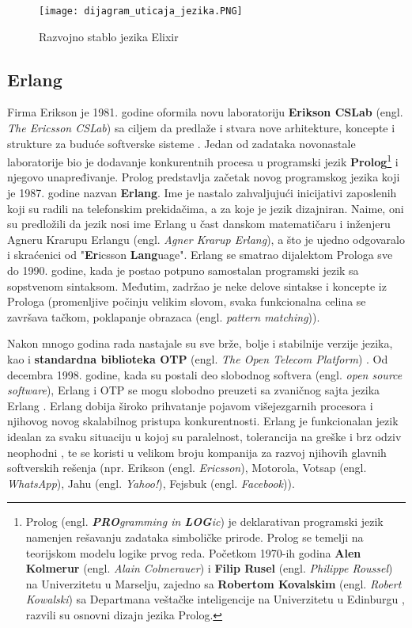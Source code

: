 \documentclass[12pt,oneside]{memoir}
\begin{document}
\begin{figure}[!ht]
  \centering
  \texttt{[image: dijagram\_uticaja\_jezika.PNG]}
  \caption{Razvojno stablo jezika Elixir}
  \label{fig:razvojnoStablo}
\end{figure}



\subsection{Erlang}
Firma Erikson je 1981. godine oformila novu laboratoriju \textbf{Erikson CSLab} (engl. \textit{The Ericsson CSLab}) sa ciljem da predlaže i stvara nove arhitekture, koncepte i strukture za buduće softverske sisteme \cite{ErlangBook2}. Jedan od zadataka novonastale laboratorije bio je dodavanje konkurentnih procesa u programski jezik \textbf{Prolog}\footnote{Prolog (engl. \textit{\textbf{PRO}gramming in \textbf{LOG}ic}) je deklarativan programski jezik namenjen rešavanju zadataka simboličke prirode. Prolog se temelji na teorijskom modelu logike prvog reda. Početkom 1970-ih godina \textbf{Alen Kolmerur} (engl. \textit{Alain Colmerauer}) i \textbf{Filip Rusel} (engl. \textit{Philippe Roussel}) na Univerzitetu u Marselju, zajedno sa \textbf{Robertom Kovalskim} (engl. \textit{Robert Kowalski}) sa Departmana veštačke inteligencije na Univerzitetu u Edinburgu , razvili su osnovni dizajn jezika Prolog.} i njegovo unapređivanje. Prolog predstavlja začetak novog programskog jezika koji je 1987. godine nazvan \textbf{Erlang}. Ime je nastalo zahvaljujući inicijativi zaposlenih koji su radili na telefonskim prekidačima, a za koje je jezik dizajniran. Naime, oni su predložili da jezik nosi ime Erlang u čast danskom matematičaru i inženjeru Agneru Krarupu Erlangu (engl. \textit{Agner Krarup Erlang}), a što je ujedno odgovaralo i skraćenici od  "\textbf{Er}icsson \textbf{Lang}uage". Erlang se smatrao dijalektom Prologa sve do 1990. godine, kada je postao potpuno samostalan programski jezik sa sopstvenom sintaksom. Međutim, zadržao je neke delove sintakse i koncepte iz Prologa (promenljive počinju velikim slovom, svaka funkcionalna celina se završava tačkom, poklapanje obrazaca (engl. \textit{pattern matching})).

Nakon mnogo godina rada nastajale su sve brže, bolje i stabilnije verzije jezika, kao i \textbf{standardna biblioteka OTP} (engl. \textit{The Open Telecom Platform}) \cite{OTP}. Od decembra 1998. godine, kada su postali deo slobodnog softvera (engl. \textit{open source software}), Erlang i OTP se mogu slobodno preuzeti sa zvaničnog sajta jezika Erlang \cite{OTP}. Erlang dobija široko prihvatanje pojavom višejezgarnih procesora i njihovog novog skalabilnog pristupa konkurentnosti. Erlang je funkcionalan jezik idealan za svaku situaciju u kojoj su paralelnost, tolerancija na greške i brz odziv neophodni \cite{ErlangBook}, te se koristi u velikom broju kompanija za razvoj njihovih glavnih softverskih rešenja (npr. Erikson (engl. \textit{Ericsson}), Motorola, Votsap (engl. \textit{WhatsApp}), Jahu (engl. \textit{Yahoo!}),
Fejsbuk (engl. \textit{Facebook})).
\end{document}
